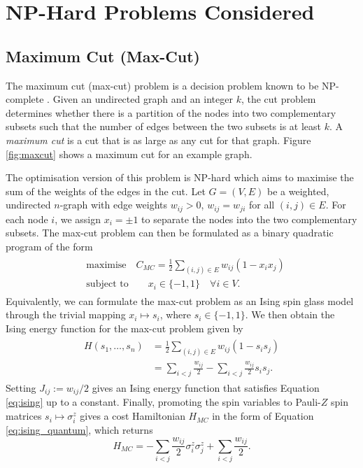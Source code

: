 
\section{NP-Hard Problems Considered} \label{sec:problem}
    \subsection{Maximum Cut (Max-Cut)}
        The maximum cut (max-cut) problem is a decision problem known to be NP-complete \cite{karp2010reducibility}. Given an undirected graph and an integer $k$, the cut problem determines whether there is a partition of the nodes into two complementary subsets such that the number of edges between the two subsets is at least $k$. A \emph{maximum cut} is a cut that is as large as any cut for that graph. Figure \ref{fig:maxcut} shows a maximum cut for an example graph.

        The optimisation version of this problem is NP-hard which aims to maximise the sum of the weights of the edges in the cut. Let $G=(V,E)$ be a weighted, undirected $n$-graph with edge weights $w_{ij}>0$, $w_{ij}=w_{ji}$ for all $(i,j)\in E$. For each node $i$, we assign $x_i=\pm1$ to separate the nodes into the two complementary subsets. The max-cut problem can then be formulated as a binary quadratic program of the form 
        \begin{align}
        \begin{split}
            &\text{maximise} \quad  C_{MC}=\frac{1}{2}\sum_{(i,j)\in E}w_{ij}(1-x_ix_j) \\
            &\text{subject to} \quad\quad x_i\in\{-1,1\}\quad\forall i\in V.
        \end{split}
        \end{align}
        Equivalently, we can formulate the max-cut problem as an Ising spin glass model  through the trivial mapping $x_i\mapsto s_i$, where $s_i\in\{-1,1\}$. We then obtain the Ising energy function for the max-cut problem given by
        \begin{align}
            \begin{split}
                H(s_1,\dots,s_n) &= \frac{1}{2}\sum_{(i,j)\in E} w_{ij}(1-s_is_j) \\
                &=\sum_{i<j}\frac{w_{ij}}{2} - \sum_{i<j}\frac{w_{ij}}{2}s_is_j.
            \end{split}
        \end{align}
        Setting $J_{ij}:= w_{ij}/2$ gives an Ising energy function that satisfies Equation \ref{eq:ising} up to a constant. Finally, promoting the spin variables to Pauli-$Z$ spin matrices $s_i\mapsto\sigma_i^z$ gives a cost Hamiltonian $H_{MC}$ in the form of Equation \ref{eq:ising_quantum}, which returns
        \begin{equation}
            H_{MC} = -\sum_{i<j}\frac{w_{ij}}{2}\sigma^z_i\sigma^z_j+\sum_{i<j}\frac{w_{ij}}{2}.
        \end{equation}

